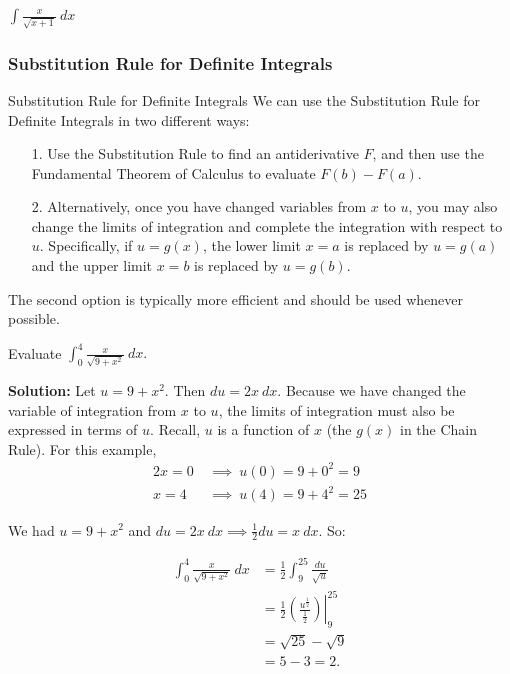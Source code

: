 \documentclass[cal1spr16Lectures.tex]{subfiles}
\begin{document}
\begin{frame}
\begin{exe}
$\int\frac{x}{\sqrt{x+1}}\ dx$
\end{exe}
\end{frame}

\subsubsection{Substitution Rule for Definite Integrals}

\begin{frame}{\small Substitution Rule for Definite Integrals}\footnotesize
We can use the Substitution Rule for Definite Integrals in two different ways:
\begin{itemize}
\item[1.] Use the Substitution Rule to find an antiderivative $F$, and then use the Fundamental Theorem of Calculus to evaluate $F(b)-F(a)$.
\item[2.] Alternatively, once you have changed variables from $x$ to $u$, you may also change the limits of integration and complete the integration with respect to $u$.  Specifically, if $u=g(x)$, the lower limit $x=a$ is replaced by $u=g(a)$ and the upper limit $x=b$ is replaced by $u=g(b)$.
\end{itemize}

\vspace{1pc}
\alert{The second option is typically more efficient and should be used whenever possible.}
\end{frame}

\begin{frame}{}\footnotesize
\begin{ex} 
Evaluate $\int_0^4 \frac{x}{\sqrt{9+x^2}}\ dx.$ 
\end{ex}

{\bf Solution:} Let $u=9+x^2$.  Then $du=2x\ dx$.  Because we have changed the variable of integration from $x$ to $u$, the limits of integration must also be expressed in terms of $u$.  Recall, $u$ is a function of $x$ (the $g(x)$ in the Chain Rule). For this example,
\begin{alignat*}{2}
x=0\ &\implies\ u(0) = 9+0^2 = 9 \\
x=4\ &\implies\ u(4) = 9+4^2 = 25 
\end{alignat*}
\end{frame}

\begin{frame}
\small
We had $u=9+x^2$ and $du=2x\ dx \implies \frac{1}{2}du=x\ dx$. So:

\begin{align*}
\int_0^4 \frac{x}{\sqrt{9+x^2}}\ dx &= \frac{1}{2}\int_{9}^{25} \frac{du}{\sqrt{u}} \\[0.5pc]
 &= \frac{1}{2} \left. \left(\frac{u^{\frac{1}{2}}}{\frac{1}{2}} \right) \right\vert_{9}^{25} \\[0.5pc]
 &= \sqrt{25}-\sqrt{9} \\[0.5pc]
 &= 5-3=2.
\end{align*}
\end{frame}
\end{document}
